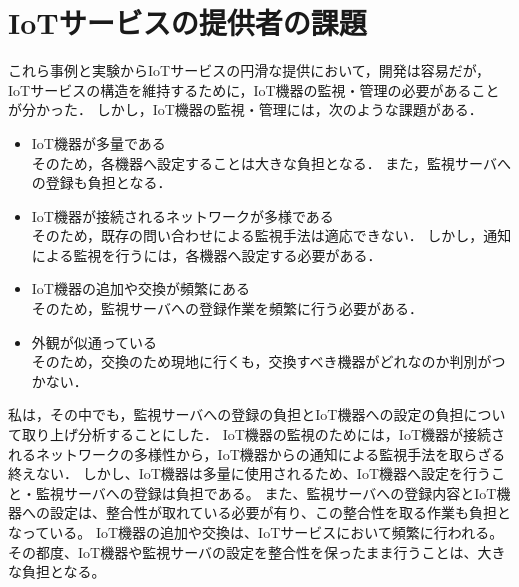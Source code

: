 \section{IoTサービスの提供者の課題}
これら事例と実験からIoTサービスの円滑な提供において，開発は容易だが，IoTサービスの構造を維持するために，IoT機器の監視・管理の必要があることが分かった．
しかし，IoT機器の監視・管理には，次のような課題がある．
\begin{itemize}
\item IoT機器が多量である\\
	そのため，各機器へ設定することは大きな負担となる．
	また，監視サーバへの登録も負担となる．
\item IoT機器が接続されるネットワークが多様である\\
	そのため，既存の問い合わせによる監視手法は適応できない．
	しかし，通知による監視を行うには，各機器へ設定する必要がある．
\item IoT機器の追加や交換が頻繁にある\\
	そのため，監視サーバへの登録作業を頻繁に行う必要がある．
\item 外観が似通っている\\
	そのため，交換のため現地に行くも，交換すべき機器がどれなのか判別がつかない．
\end{itemize}


私は，その中でも，監視サーバへの登録の負担とIoT機器への設定の負担について取り上げ分析することにした．
IoT機器の監視のためには，IoT機器が接続されるネットワークの多様性から，IoT機器からの通知による監視手法を取らざる終えない．
しかし、IoT機器は多量に使用されるため、IoT機器へ設定を行うこと・監視サーバへの登録は負担である。
また、監視サーバへの登録内容とIoT機器への設定は、整合性が取れている必要が有り、この整合性を取る作業も負担となっている。
IoT機器の追加や交換は、IoTサービスにおいて頻繁に行われる。
その都度、IoT機器や監視サーバの設定を整合性を保ったまま行うことは、大きな負担となる。


